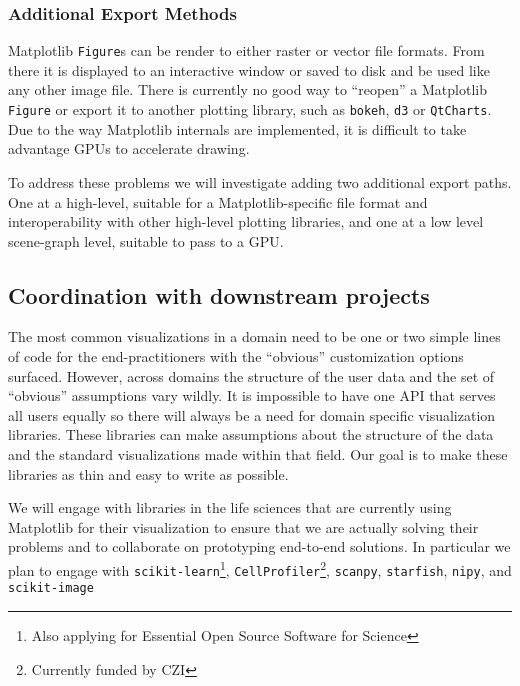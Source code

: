 \documentclass[11pt]{article}  %
\begin{document}
\subsubsection{Additional Export Methods}

Matplotlib \texttt{Figure}s can be render to either raster or vector
file formats.  From there it is displayed to an interactive window or
saved to disk and be used like any other image file.  There is
currently no good way to ``reopen'' a Matplotlib \texttt{Figure} or
export it to another plotting library, such as \texttt{bokeh},
\texttt{d3} or \texttt{QtCharts}.  Due to the way Matplotlib
internals are implemented, it is difficult to take advantage GPUs to
accelerate drawing.

To address these problems we will investigate adding two additional
export paths.  One at a high-level, suitable for a Matplotlib-specific
file format and interoperability with other high-level plotting
libraries, and one at a low level scene-graph level, suitable to pass
to a GPU.


\subsection{Coordination with downstream projects}


The most common visualizations in a domain need to be one or two
simple lines of code for the end-practitioners with the ``obvious''
customization options surfaced.  However, across domains the structure
of the user data and the set of ``obvious'' assumptions vary wildly.
It is impossible to have one API that serves all users equally so
there will always be a need for domain specific visualization
libraries.  These libraries can make assumptions about the structure
of the data and the standard visualizations made within that field.
Our goal is to make these libraries as thin and easy to write as
possible.

We will engage with libraries in the life sciences that are currently
using Matplotlib for their visualization to ensure that we are
actually solving their problems and to collaborate on prototyping
end-to-end solutions.  In particular we plan to engage with
\texttt{scikit-learn}\footnote{Also applying for Essential Open Source
Software for Science}, \texttt{CellProfiler}\footnote{Currently funded
by CZI\label{f:czi}}, \texttt{scanpy},
\texttt{starfish}, \texttt{nipy}, and
\texttt{scikit-image}
\end{document}
